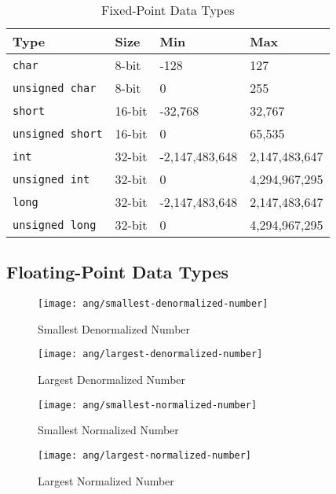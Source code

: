\begin{table}[H]
\centering
\caption{Fixed-Point Data Types}
\label{fixed-point-data-types}
\begin{tabu} to \textwidth {XXXX}
\toprule
Type &Size &Min &Max\\
\hline
\texttt{char} &8-bit &-128 &127\\
\hline
\texttt{unsigned char} &8-bit &0 &255\\
\hline
\texttt{short} &16-bit &-32,768 &32,767\\
\hline
\texttt{unsigned short} &16-bit &0 &65,535\\
\hline
\texttt{int} &32-bit &-2,147,483,648 &2,147,483,647\\
\hline
\texttt{unsigned int} &32-bit &0 &4,294,967,295\\
\hline
\texttt{long} &32-bit &-2,147,483,648 &2,147,483,647\\
\hline
\texttt{unsigned long} &32-bit &0 &4,294,967,295\\
\bottomrule
\end{tabu}
\end{table}

\subsection{Floating-Point Data Types}
\label{subsection:float-data-type}

\begin{figure}[H]
\begin{minipage}[t]{0.5\linewidth}
\centering
\texttt{[image: ang/smallest-denormalized-number]}
\caption{Smallest Denormalized Number}
\label{ang/smallest-denormalized-number}
\end{minipage}
\begin{minipage}[t]{0.5\linewidth}
\centering
\texttt{[image: ang/largest-denormalized-number]}
\caption{Largest Denormalized Number}
\label{ang/largest-denormalized-number}
\end{minipage}
\end{figure}

\begin{figure}[H]
\begin{minipage}[t]{0.5\linewidth}
\centering
\texttt{[image: ang/smallest-normalized-number]}
\caption{Smallest Normalized Number}
\label{ang/smallest-normalized-number}
\end{minipage}
\begin{minipage}[t]{0.5\linewidth}
\centering
\texttt{[image: ang/largest-normalized-number]}
\caption{Largest Normalized Number}
\label{ang/largest-normalized-number}
\end{minipage}
\end{figure}

